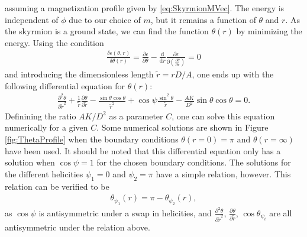 assuming a magnetization profile given by \eqref{eq:SkyrmionMVec}. The energy is independent of $\phi$ due to our choice of $m$, but it remains a function of $\theta$ and $r$. As the skyrmion is a ground state, we can find the function $\theta(r)$ by minimizing the energy. Using the condition
\begin{align}
\frac{\delta\epsilon(\theta, r)}{\delta\theta(r)} = \frac{\partial\epsilon}{\partial\theta} - \frac{\textrm{d}}{\textrm{d}r} \frac{\partial\epsilon}{\partial (\frac{\partial\theta}{\partial r})} = 0
\end{align}
and introducing the dimensionless length $\tilde{r} = r D/A$, one ends up with the following differential equation for $\theta(r)$:
\begin{align}
\label{eq:ODEtheta}
\frac{\partial^2\theta}{\partial\tilde{r}^2} + \frac{1}{\tilde{r}}\frac{\partial\theta}{\partial\tilde{r}} - \frac{\sin\theta\cos\theta}{\tilde{r}^2}+\cos\psi\frac{\sin^2\theta}{\tilde{r}}-\frac{AK}{D^2}\sin\theta\cos\theta = 0.
\end{align}
Definining the ratio $AK/D^2$ as a parameter $C$, one can solve this equation numerically for a given $C$. Some numerical solutions are shown in Figure \ref{fig:ThetaProfile} when the boundary conditions $\theta(r = 0) = \pi$ and $\theta(r = \infty)$ have been used. It should be noted that this differential equation only has a solution when $\cos\psi = 1$ for the chosen boundary conditions. The solutions for the different helicities $\psi_1 = 0$ and $\psi_2 = \pi$ have a simple relation, however. This relation can be verified to be
\begin{align}
\label{eq:ThetaHelicityRelation}
\theta_{\psi_1}(r) = \pi - \theta_{\psi_2}(r),
\end{align}
as $\cos\psi$ is antisymmetric under a swap in helicities, and $\frac{\partial^2\theta}{\partial\tilde{r}^2}$, $\frac{\partial\theta}{\partial\tilde{r}}$, $\cos\theta_{\psi_i}$ are all antisymmetric under the relation above.

